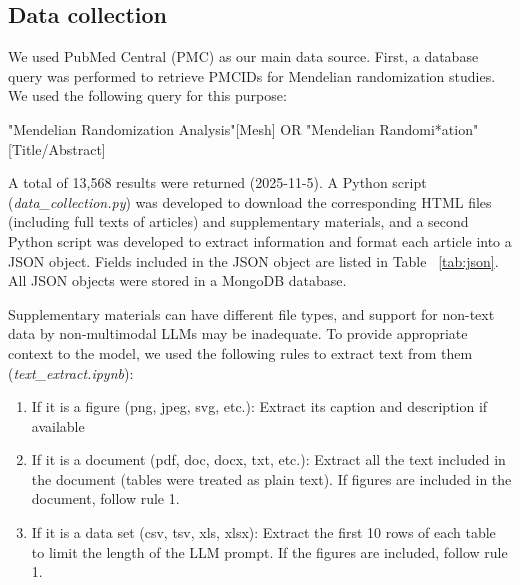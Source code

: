 



\subsection{Data collection}

We used PubMed Central (PMC) as our main data source. First, a database query was performed to retrieve PMCIDs for Mendelian randomization studies. We used the following query for this purpose: 

"Mendelian Randomization Analysis"[Mesh] OR "Mendelian Randomi*ation"[Title/Abstract] 

A total of 13,568 results were returned (2025-11-5). A Python script (\textit{data\_collection.py}) was developed to download the corresponding HTML files (including full texts of articles) and supplementary materials, and a second Python script was developed to extract information and format each article into a JSON object. Fields included in the JSON object are listed in Table ~\ref{tab:json}. All JSON objects were stored in a MongoDB database. 

Supplementary materials can have different file types, and support for non-text data by non-multimodal LLMs may be inadequate. To provide appropriate context to the model, we used the following rules to extract text from them (\textit{text\_extract.ipynb}):  
\begin{enumerate}
    \item If it is a figure (png, jpeg, svg, etc.): Extract its caption and description if available 
    \item If it is a document (pdf, doc, docx, txt, etc.): Extract all the text included in the document (tables were treated as plain text). If figures are included in the document, follow rule 1. 
    \item If it is a data set (csv, tsv, xls, xlsx): Extract the first 10 rows of each table to limit the length of the LLM prompt. If the figures are included, follow rule 1. 
\end{enumerate}

